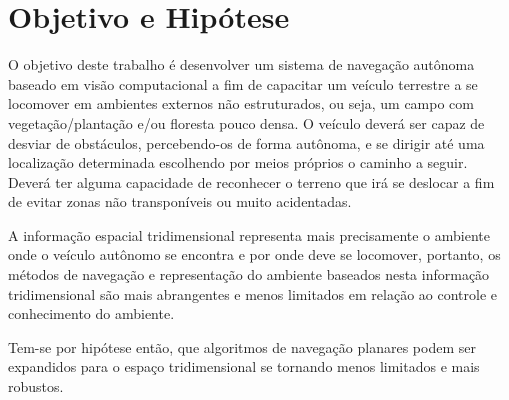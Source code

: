 \section{Objetivo e Hipótese}

O objetivo deste trabalho é desenvolver um sistema de navegação autônoma baseado
em visão computacional a fim de capacitar um veículo terrestre a se locomover em
ambientes externos não estruturados, ou seja, um campo com vegetação/plantação
e/ou floresta pouco densa. O veículo deverá ser capaz de desviar de obstáculos,
percebendo-os de forma autônoma, e se dirigir até uma localização determinada
escolhendo por meios próprios o caminho a seguir. Deverá ter alguma capacidade
de reconhecer o terreno que irá se deslocar a fim de evitar zonas não
transponíveis ou muito acidentadas.

A informação espacial tridimensional representa mais precisamente o ambiente
onde o veículo autônomo se encontra e por onde deve se locomover, portanto, os
métodos de navegação e representação do ambiente baseados nesta informação
tridimensional são mais abrangentes e menos limitados em relação ao controle e
conhecimento do ambiente.

Tem-se por hipótese então, que algoritmos de navegação planares podem ser
expandidos para o espaço tridimensional se tornando menos limitados e mais
robustos.

